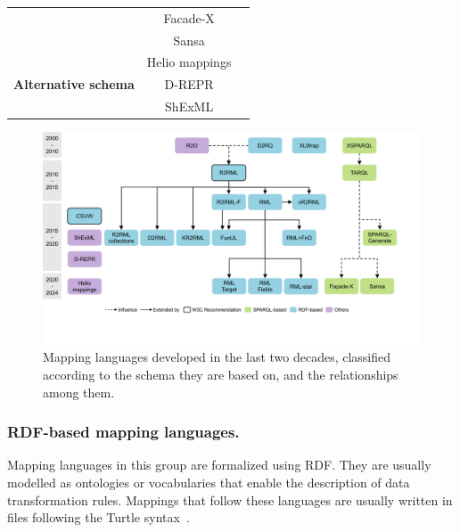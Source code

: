 \begin{table}[t]
{\begin{tabular}{ccc}
                              & Facade-X        & \parencite{asprino2023sparql-anything,sparqlanything}\\ \cmidrule{2-3}
                              & Sansa            & \parencite{stadler2023spark}\\ \midrule
\multirow{4}{*}{\textbf{Alternative schema}}       & Helio mappings  & \parencite{cimmino2022helio}\\ \cmidrule{2-3} 
                              & D-REPR          & \parencite{Vu2019d-repr}\\ \cmidrule{2-3} 
                              & ShExML          & \parencite{Garcia-Gonzalez2020shexml,shexml}\\  \bottomrule
\end{tabular}}
\end{table}



\begin{figure}[t]
\centering
\includegraphics[width=1\linewidth]{figures/chp2_mapping_languages}
\caption[Existing mapping languages and the relationships among them]{Mapping languages developed in the last two decades, classified according to the schema they are based on, and the relationships among them.}
\label{fig:chp2_mapping_languages}
\end{figure}

\subsubsection{RDF-based mapping languages.} 
\label{sec:chp2_RDF-languages}

Mapping languages in this group are formalized using RDF. They are usually modelled as ontologies or vocabularies that enable the description of data transformation rules. Mappings that follow these languages are usually written in files following the Turtle syntax~\parencite{turtle}. 



